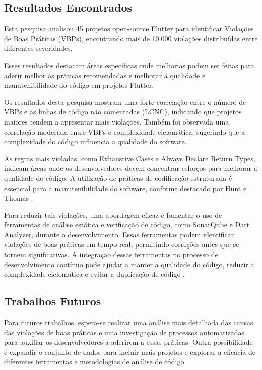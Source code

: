 \documentclass[12pt]{article}
\begin{document}
\subsection{Resultados Encontrados}
Esta pesquisa analisou 45 projetos open-source Flutter para identificar Violações de Boas Práticas (VBPs), encontrando mais de 10.000 violações distribuídas entre diferentes severidades.


Esses resultados destacam áreas específicas onde melhorias podem ser feitas para aderir melhor às práticas recomendadas e melhorar a qualidade e manutenibilidade do código em projetos Flutter.

Os resultados desta pesquisa mostram uma forte correlação entre o número de VBPs e as linhas de código não comentadas (LCNC), indicando que projetos maiores tendem a apresentar mais violações. Também foi observada uma correlação moderada entre VBPs e complexidade ciclomática, sugerindo que a complexidade do código influencia a qualidade do software.

As regras mais violadas, como Exhaustive Cases e Always Declare Return Types, indicam áreas onde os desenvolvedores devem concentrar esforços para melhorar a qualidade do código. A utilização de práticas de codificação estruturada é essencial para a manutenibilidade do software, conforme destacado por Hunt e Thomas \cite{hunt1999pragmatic}.

Para reduzir tais violações, uma abordagem eficaz é fomentar o uso de ferramentas de análise estática e verificação de código, como SonarQube e Dart Analyzer, durante o desenvolvimento.  Essas ferramentas podem identificar violações de boas práticas em tempo real, permitindo correções antes que se tornem significativas. A integração dessas ferramentas no processo de desenvolvimento contínuo pode ajudar a manter a qualidade do código, reduzir a complexidade ciclomática e evitar a duplicação de código \cite{measuringCC2023}.

\subsection{Trabalhos Futuros}
Para futuros trabalhos, espera-se realizar uma análise mais detalhada das causas das violações de boas práticas e uma investigação de processos automatizadas para auxiliar os desenvolvedores a aderirem a essas práticas. Outra possibilidade é expandir o conjunto de dados para incluir mais projetos e explorar a eficácia de diferentes ferramentas e metodologias de análise de código.





\end{document}
